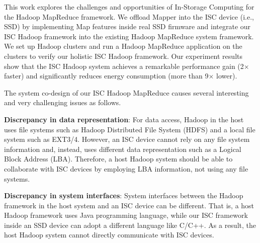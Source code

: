 This work explores the challenges and opportunities of In-Storage Computing for the Hadoop MapReduce framework. We offload Mapper into the ISC device (i.e., SSD) by implementing Map features inside real SSD firmware and integrate our ISC Hadoop framework into the existing Hadoop MapReduce system framework. We set up Hadoop clusters and run a Hadoop MapReduce application on the clusters to verify our holistic ISC Hadoop framework. Our experiment results show that the ISC Hadoop system achieves a remarkable performance gain (2$\times$ faster) and significantly reduces energy consumption (more than 9$\times$ lower). 

The system co-design of our ISC Hadoop MapReduce causes several interesting and very challenging issues as follows.

\textbf{Discrepancy in data representation}: For data access, Hadoop in the host uses file systems such as Hadoop Distributed File System (HDFS) and a local file system such as EXT3/4. However, an ISC device cannot rely on any file system information and, instead, uses different data representation such as a Logical Block Address (LBA). Therefore, a host Hadoop system should be able to collaborate with ISC devices by employing LBA information, not using any file systems.



\textbf{Discrepancy in system interfaces}: System interfaces between the Hadoop framework in the host system and an ISC device can be different. That is, a host Hadoop framework uses Java programming language, while our ISC framework inside an SSD device can adopt a different language like C/C++. As a result, the host Hadoop system cannot directly communicate with ISC devices. %


